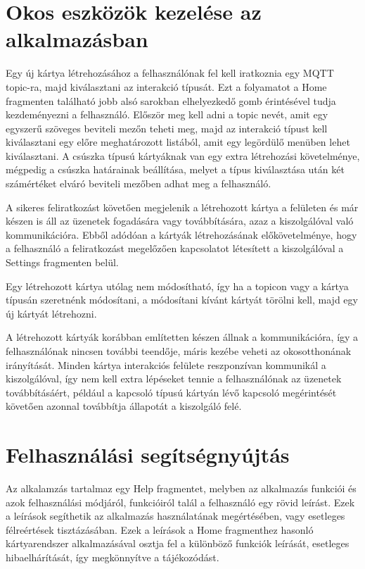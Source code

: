 \documentclass[]{thesis-ekf}
\theoremstyle{definition}
\theoremstyle{remark}
\begin{document}
\section{Okos eszközök kezelése az alkalmazásban}
Egy új kártya létrehozásához a felhasználónak fel kell iratkoznia egy MQTT topic-ra, majd kiválasztani az interakció
típusát. Ezt a folyamatot a Home fragmenten található jobb alsó sarokban elhelyezkedő gomb érintésével
tudja kezdeményezni a felhasználó. Először meg kell adni a topic nevét, amit egy egyszerű szöveges beviteli mezőn
teheti meg, majd az interakció típust kell kiválasztani egy előre meghatározott listából, amit egy legördülő
menüben lehet kiválasztani. A csúszka típusú kártyáknak van egy extra létrehozási követelménye, mégpedig a
csúszka határainak beállítása, melyet a típus kiválasztása után két számértéket elváró beviteli mezőben adhat
meg a felhasználó.

A sikeres feliratkozást követően megjelenik a létrehozott kártya a felületen és már készen is áll az üzenetek
fogadására vagy továbbítására, azaz a kiszolgálóval való kommunikációra. Ebből adódóan a kártyák létrehozásának
előkövetelménye, hogy a felhasználó a feliratkozást megelőzően kapcsolatot létesített a kiszolgálóval a Settings 
fragmenten belül.

Egy létrehozott kártya utólag nem módosítható, így ha a topicon vagy a kártya típusán szeretnénk módosítani,
a módosítani kívánt kártyát törölni kell, majd egy új kártyát létrehozni.

A létrehozott kártyák korábban említetten készen állnak a kommunikációra, így a felhasználónak nincsen további teendője,
máris kezébe veheti az okosotthonának irányítását. Minden kártya interakciós felülete reszponzívan kommunikál
a kiszolgálóval, így nem kell extra lépéseket tennie a felhasználónak az üzenetek továbbításáért, például a kapcsoló
típusú kártyán lévő kapcsoló megérintését követően azonnal továbbítja állapotát a kiszolgáló felé.

\section{Felhasználási segítségnyújtás}
Az alkalamzás tartalmaz egy Help fragmentet, melyben az alkalmazás funkciói és azok felhasználási módjáról,
funkcióiról talál a felhasználó egy rövid leírást. Ezek a leírások segíthetik az alkalmazás használatának
megértésében, vagy esetleges félreértések tisztázásában. Ezek a leírások a Home fragmenthez hasonló kártyarendszer
alkalmazásával osztja fel a különböző funkciók leírását, esetleges hibaelhárítását, így megkönnyítve a tájékozódást.
\end{document}
